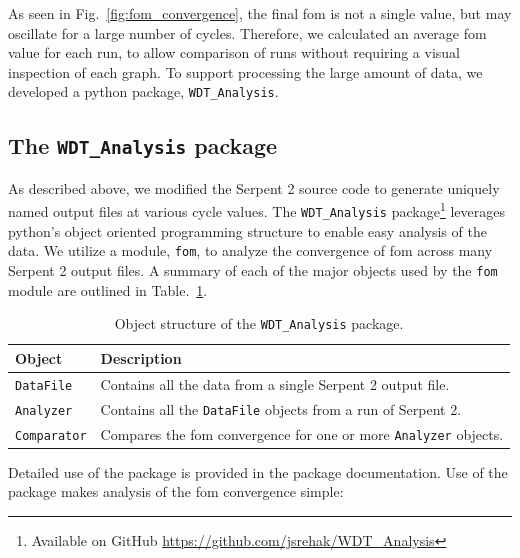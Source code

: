 As seen in Fig.~\ref{fig:fom_convergence}, the final \gls{fom} is not
a single value, but may oscillate for a large number of
cycles. Therefore, we calculated an average \gls{fom} value for each
run, to allow comparison of runs without requiring a visual inspection
of each graph. To support processing the large amount of data, we
developed a python package, \verb|WDT_Analysis|.

\subsection{The \texttt{WDT\_Analysis} package}
\label{sec:wdt_analysis}

As described above, we modified the Serpent 2 source code to generate
uniquely named output files at various cycle values. The
\verb|WDT_Analysis| package\footnote{Available on GitHub
  \url{https://github.com/jsrehak/WDT_Analysis}} leverages python's
object oriented
programming structure to enable easy analysis of the data. We utilize
a module, \verb|fom|, to analyze the convergence of \gls{fom} across
many Serpent 2 output files. A summary
of each of the major objects used by the \verb|fom| module are outlined in
Table.~\ref{tab:wdt_analysis}.
\begin{table}[hbtp]
  \centering
  \caption{Object structure of the \texttt{WDT\_Analysis} package.\label{tab:wdt_analysis}}
  \begin{tabular}{ll} \toprule
   \textbf{Object} & \textbf{Description} \\ \midrule
    \verb|DataFile| & Contains all the data from a single Serpent 2
                      output file. \\
    \verb|Analyzer| & Contains all the \verb|DataFile| objects
                       from a run of Serpent 2. \\
    \verb|Comparator| & Compares the \gls{fom} convergence for one or
                        more \verb|Analyzer| objects. \\
    \bottomrule
  \end{tabular}
\end{table}
Detailed use of the package is provided in the package
documentation. Use of the package makes analysis of the \gls{fom}
convergence simple:
